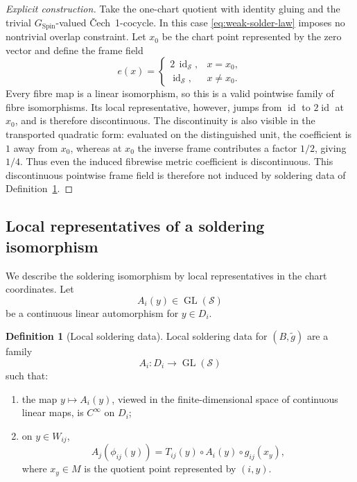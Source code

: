 \documentclass[11pt,a4paper]{article}
\theoremstyle{definition}
\newtheorem{definition}[theorem]{Definition}
\theoremstyle{remark}
\newcommand{\Smodel}{\mathcal{S}}
\newcommand{\SpinG}{G_{\mathrm{Spin}}}
\newcommand{\GL}{\operatorname{GL}}
\newcommand{\id}{\operatorname{id}}
\newcommand{\Cech}{\ifmmode\text{\v{C}ech}\else\v{C}ech\fi}
\begin{document}
\begin{proof}[Explicit construction]
Take the one-chart quotient with identity gluing and the trivial \(\SpinG\)-valued \Cech\ 1-cocycle.  In this case \eqref{eq:weak-solder-law} imposes no
nontrivial overlap constraint.  Let \(x_0\) be the chart point represented
by the zero vector and define the frame field
\[
 e(x)=
 \begin{cases}
   2\,\id_{\Smodel}, & x=x_0,\\
   \id_{\Smodel}, & x\ne x_0.
 \end{cases}
\tag{7.2a}\label{eq:bad-solder}
\]
Every fibre map is a linear isomorphism, so this is a valid pointwise family of fibre isomorphisms.
Its local representative, however, jumps from \(\id\) to \(2\id\) at
\(x_0\), and is therefore discontinuous.  The discontinuity is also visible in
the transported quadratic form: evaluated on the distinguished unit, the
coefficient is \(1\) away from \(x_0\), whereas at \(x_0\) the inverse
frame contributes a factor \(1/2\), giving \(1/4\).  Thus even the induced
fibrewise metric coefficient is discontinuous.  This discontinuous pointwise frame field is therefore not induced by soldering data of Definition~\ref{def:soldering}.
\end{proof}

\subsection{Local representatives of a soldering isomorphism}

We describe the soldering isomorphism by local representatives in the chart coordinates.  Let
\[
   A_i(y)\in\GL(\Smodel)
\]
be a continuous linear automorphism for \(y\in D_i\).

\begin{definition}[Local soldering data]
\label{def:soldering}
Local soldering data for \((B,\widetilde g)\) are a family
\[
   A_i:D_i\longrightarrow\GL(\Smodel)
\tag{7.3}
\]
such that:
\begin{enumerate}
\item the map \(y\mapsto A_i(y)\), viewed in the finite-dimensional space
      of continuous linear maps, is \(C^\infty\) on \(D_i\);
\item on \(y\in W_{ij}\),
\[
  A_j(\phi_{ij}(y))
  =
  T_{ij}(y)\circ A_i(y)\circ
  g_{ij}(x_y),
\tag{7.4}\label{eq:soldering-law}
\]
where \(x_y\in M\) is the quotient point represented by \((i,y)\).
\end{enumerate}
\end{definition}
\end{document}
